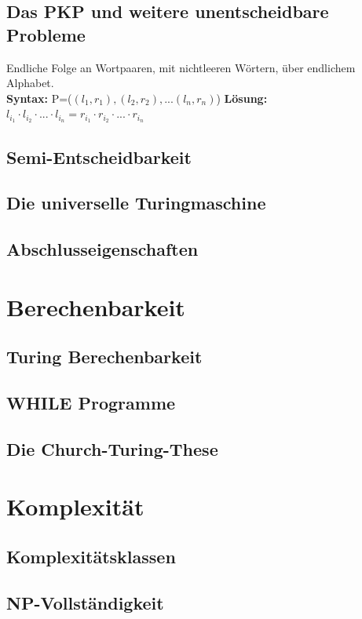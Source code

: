 \documentclass[12pt,a4paper]{article}
\begin{document}
	\subsection{Das PKP und weitere unentscheidbare Probleme}
	Endliche Folge an Wortpaaren, mit nichtleeren Wörtern, über endlichem Alphabet.\\
	\textbf{Syntax:} P=($(l_1, r_1), (l_2, r_2), ...(l_n, r_n)$) \hfill \textbf{Lösung:} $l_{i_1} \cdot l_{i_2} \cdot ... \cdot l_{i_n} = r_{i_1} \cdot r_{i_2} \cdot ... \cdot r_{i_n}$

	\subsection{Semi-Entscheidbarkeit}
	
	\subsection{Die universelle Turingmaschine}

	\subsection{Abschlusseigenschaften}

\section{Berechenbarkeit}
	\subsection{Turing Berechenbarkeit}

	\subsection{WHILE Programme}

	\subsection{Die Church-Turing-These}

\section{Komplexität}
	\subsection{Komplexitätsklassen}

	\subsection{NP-Vollständigkeit}
\end{document}
